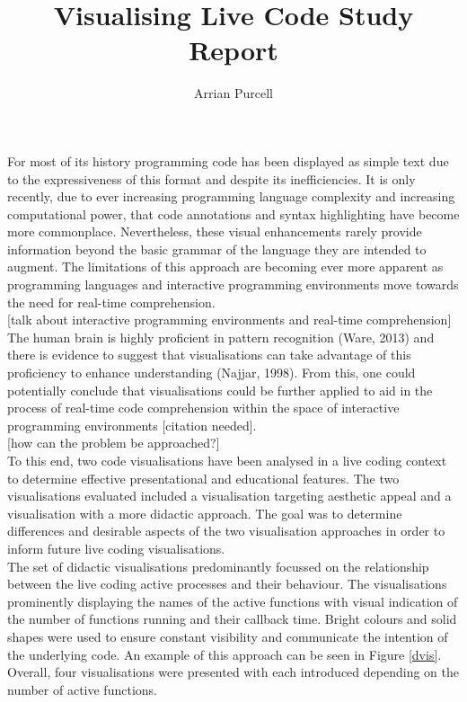 \documentclass{article}
\begin{document}
\title{Visualising Live Code Study Report}
\author{Arrian Purcell}

\maketitle



For most of its history programming code has been displayed as simple text due to the expressiveness of this format and despite its inefficiencies. It is only recently, due to ever increasing programming language complexity and increasing computational power, that code annotations and syntax highlighting have become more commonplace. Nevertheless, these visual enhancements rarely provide information beyond the basic grammar of the language they are intended to augment. The limitations of this approach are becoming ever more apparent as programming languages and interactive programming environments move towards the need for real-time comprehension.\\

[talk about interactive programming environments and real-time comprehension]\\

The human brain is highly proficient in pattern recognition (Ware, 2013) and there is evidence to suggest that visualisations can take advantage of this proficiency to enhance understanding (Najjar, 1998). From this, one could potentially conclude that visualisations could be further applied to aid in the process of real-time code comprehension within the space of interactive programming environments [citation needed].\\

[how can the problem be approached?]\\

To this end, two code visualisations have been analysed in a live coding context to determine effective presentational and educational features. The two visualisations evaluated included a visualisation targeting aesthetic appeal and a visualisation with a more didactic approach. The goal was to determine differences and desirable aspects of the two visualisation approaches in order to inform future live coding visualisations.\\

The set of didactic visualisations predominantly focussed on the relationship between the live coding active processes and their behaviour. The visualisations prominently displaying the names of the active functions with visual indication of the number of functions running and their callback time. Bright colours and solid shapes were used to ensure constant visibility and communicate the intention of the underlying code. An example of this approach can be seen in Figure \ref{dvis}. Overall, four visualisations were presented with each introduced depending on the number of active functions.\\
\end{document}
